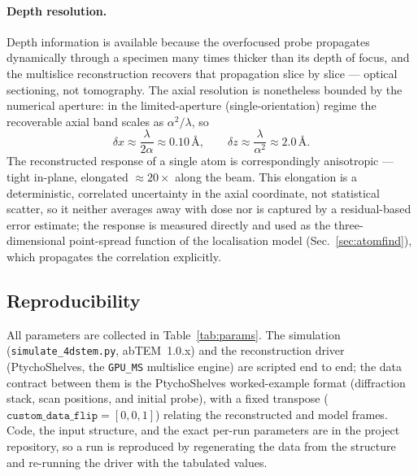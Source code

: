 \paragraph{Depth resolution.}
Depth information is available because the overfocused probe propagates dynamically through a
specimen many times thicker than its depth of focus, and the multislice reconstruction
recovers that propagation slice by slice --- optical sectioning, not tomography. The axial
resolution is nonetheless bounded by the numerical aperture: in the limited-aperture
(single-orientation) regime the recoverable axial band scales as $\alpha^2/\lambda$, so
\begin{equation}
  \delta x \approx \frac{\lambda}{2\alpha}\approx 0.10\,\text{\AA},
  \qquad
  \delta z \approx \frac{\lambda}{\alpha^2}\approx 2.0\,\text{\AA}.
  \label{eq:resolution}
\end{equation}
The reconstructed response of a single atom is correspondingly anisotropic --- tight in-plane,
elongated $\approx20\times$ along the beam. This elongation is a deterministic, correlated
uncertainty in the axial coordinate, not statistical scatter, so it neither averages away with
dose nor is captured by a residual-based error estimate; the response is measured directly and
used as the three-dimensional point-spread function of the localisation model
(Sec.~\ref{sec:atomfind}), which propagates the correlation explicitly.

\subsection{Reproducibility}
\label{sec:repro}

All parameters are collected in Table~\ref{tab:params}. The simulation
(\texttt{simulate\_4dstem.py}, abTEM~1.0.x) and the reconstruction driver (PtychoShelves, the
\texttt{GPU\_MS} multislice engine) are scripted end to end; the data contract between them
is the PtychoShelves worked-example format (diffraction stack, scan positions, and initial
probe), with a fixed transpose ($\texttt{custom\_data\_flip}=[0,0,1]$) relating the
reconstructed and model frames. Code, the input structure, and the exact per-run parameters
are in the project repository, so a run is reproduced by regenerating the data from the
structure and re-running the driver with the tabulated values.

